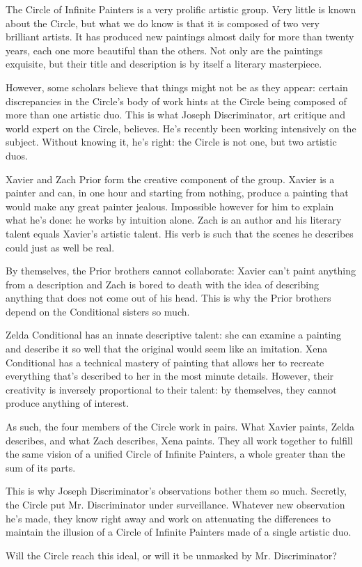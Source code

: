 \documentclass{article}
\begin{document}
{The Circle of Infinite Painters is a very prolific artistic group. Very little
is known about the Circle, but what we do know is that it is composed of two
very brilliant artists. It has produced new paintings almost daily for more than
twenty years, each one more beautiful than the others. Not only are the
paintings exquisite, but their title and description is by itself a literary
masterpiece.

However, some scholars believe that things might not be as they appear: certain
discrepancies in the Circle's body of work hints at the Circle being composed of
more than one artistic duo. This is what Joseph Discriminator, art critique and
world expert on the Circle, believes. He's recently been working intensively on
the subject. Without knowing it, he's right: the Circle is not one, but two
artistic duos.

Xavier and Zach Prior form the creative component of the group. Xavier is a
painter and can, in one hour and starting from nothing, produce a painting that
would make any great painter jealous. Impossible however for him to explain
what he's done: he works by intuition alone. Zach is an author and his literary
talent equals Xavier's artistic talent. His verb is such that the scenes he
describes could just as well be real.

By themselves, the Prior brothers cannot collaborate: Xavier can't paint
anything from a description and Zach is bored to death with the idea of
describing anything that does not come out of his head. This is why the Prior
brothers depend on the Conditional sisters so much.

Zelda Conditional has an innate descriptive talent: she can examine a painting
and describe it so well that the original would seem like an imitation. Xena
Conditional has a technical mastery of painting that allows her to recreate
everything that's described to her in the most minute details. However, their
creativity is inversely proportional to their talent: by themselves, they cannot
produce anything of interest.

As such, the four members of the Circle work in pairs. What Xavier paints, Zelda
describes, and what Zach describes, Xena paints. They all work together to
fulfill the same vision of a unified Circle of Infinite Painters, a whole greater
than the sum of its parts.

This is why Joseph Discriminator's observations bother them so much. Secretly,
the Circle put Mr. Discriminator under surveillance. Whatever new observation
he's made, they know right away and work on attenuating the differences to
maintain the illusion of a Circle of Infinite Painters made of a single artistic
duo.

Will the Circle reach this ideal, or will it be unmasked by Mr. Discriminator?
}{}
\end{document}
